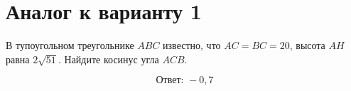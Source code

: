 \documentclass[12pt,a4paper]{article}
\begin{document}
\section*{Аналог к варианту 1}
В тупоугольном треугольнике \(ABC\) известно, что \(AC=BC=20\), высота \(AH\) равна \(2\sqrt{51}\). Найдите косинус угла \(ACB\).
\begin{center}\figIsoscelesObtuse\end{center}
\[\boxed{\text{Ответ: }-0{,}7}\]
\end{document}
